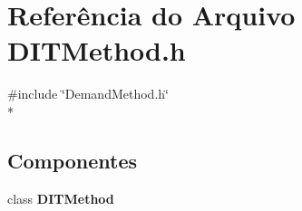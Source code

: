 \section{Referência do Arquivo D\+I\+T\+Method.\+h}
\label{_d_i_t_method_8h}
{\ttfamily \#include \char`\"{}Demand\+Method.\+h\char`\"{}}\\*
\subsection*{Componentes}
\begin{DoxyCompactItemize}
\item 
class {\bf D\+I\+T\+Method}
\end{DoxyCompactItemize}
